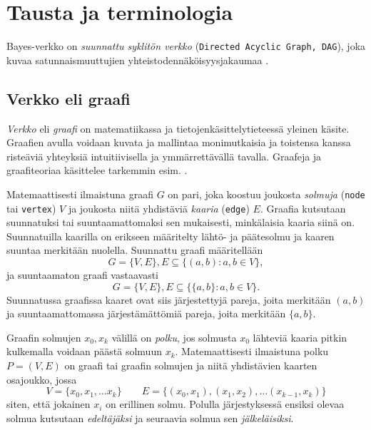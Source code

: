 \chapter{Tausta ja terminologia\label{background}} 

Bayes-verkko on \emph{suunnattu syklitön verkko} (\texttt{Directed Acyclic Graph, DAG}), joka kuvaa satunnaismuuttujien yhteistodennäköisyysjakaumaa \citep{ruggeri_bayesian_2008}. 

\section{Verkko eli graafi} 

\emph{Verkko} eli \emph{graafi} on matematiikassa ja tietojenkäsittelytieteessä yleinen käsite. Graafien avulla voidaan kuvata ja mallintaa monimutkaisia ja toistensa kanssa risteäviä yhteyksiä intuitiivisella ja ymmärrettävällä tavalla. Graafeja ja graafiteoriaa käsittelee tarkemmin esim. \citet{diestel_graph_2017}. 

\begin{center} 
\centering 
\begin{minipage}{.5\textwidth} 
  \centering 
\end{minipage}%
\begin{minipage}{.5\textwidth} 
  \centering 
\end{minipage} 
\end{center} 

Matemaattisesti ilmaistuna graafi $G$ on pari, joka koostuu joukosta \emph{solmuja} (\texttt{node} tai \texttt{vertex}) $V$ ja joukosta niitä yhdistäviä \emph{kaaria} (\texttt{edge}) $E$. Graafia kutsutaan suunnatuksi tai suuntaamattomaksi sen mukaisesti, minkälaisia kaaria siinä on. Suunnatuilla kaarilla on erikseen määritelty lähtö- ja päätesolmu ja kaaren suuntaa merkitään nuolella. Suunnattu graafi määritellään  
$$ 
    G = \{V, E\}, E \subseteq \{(a,b) : a,b \in V \}, 
$$ 
ja suuntaamaton graafi vastaavasti 
$$ 
    G = \{V, E\}, E \subseteq \{\{a,b\} : a,b \in V \}. 
$$ 
Suunnatussa graafissa kaaret ovat siis järjestettyjä pareja, joita merkitään $(a,b)$ ja suuntaamattomassa järjestämättömiä pareja, joita merkitään $\{a,b\}$. 

Graafin solmujen $x_0, x_k$ välillä on \emph{polku}, jos solmusta $x_0$ lähteviä kaaria pitkin kulkemalla voidaan päästä solmuun $x_k$. Matemaattisesti ilmaistuna polku $P=(V,E)$ on graafi tai graafin solmujen ja niitä yhdistävien kaarten osajoukko, jossa  
$$ 
    V = \{x_0, x_1, \ldots x_k \} \qquad E = \{(x_0, x_1), (x_1,x_2),\ldots(x_{k-1}, x_k)\} 
$$  
siten, että jokainen $x_i$ on erillinen solmu. Polulla järjestyksessä ensiksi olevaa solmua kutsutaan \emph{edeltäjäksi} ja seuraavia solmua sen \emph{jälkeläisiksi}. 

